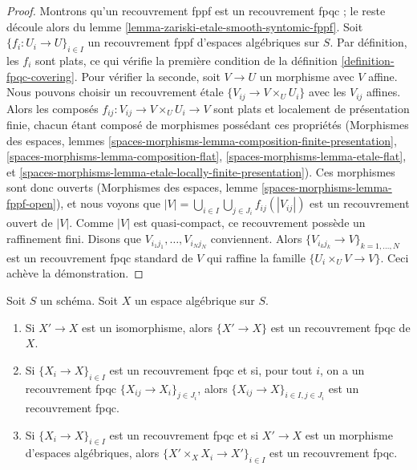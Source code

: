 \begin{proof}
Montrons qu'un recouvrement fppf est un recouvrement fpqc ; le
reste découle alors du
lemme \ref{lemma-zariski-etale-smooth-syntomic-fppf}.
Soit $\{f_i : U_i \to U\}_{i \in I}$ un
recouvrement fppf d'espaces algébriques sur $S$.
Par définition, les $f_i$ sont plats, ce qui vérifie la première
condition de la définition \ref{definition-fpqc-covering}. Pour vérifier la
seconde, soit $V \to U$ un morphisme avec $V$ affine.
Nous pouvons choisir un recouvrement \'etale $\{V_{ij} \to V \times_U U_i\}$
avec les $V_{ij}$ affines. Alors les composés
$f_{ij} : V_{ij} \to V \times_U U_i \to V$ sont plats et localement de
présentation finie, chacun étant composé de morphismes possédant ces propriétés
(Morphismes des espaces, lemmes
\ref{spaces-morphisms-lemma-composition-finite-presentation},
\ref{spaces-morphisms-lemma-composition-flat},
\ref{spaces-morphisms-lemma-etale-flat}, et
\ref{spaces-morphisms-lemma-etale-locally-finite-presentation}).
Ces morphismes sont donc ouverts
(Morphismes des espaces, lemme \ref{spaces-morphisms-lemma-fppf-open}),
et nous voyons que
$|V| = \bigcup_{i \in I} \bigcup_{j \in J_i} f_{ij}(|V_{ij}|)$
est un recouvrement ouvert de $|V|$.
Comme $|V|$ est quasi-compact, ce recouvrement possède un
raffinement fini.
Disons que $V_{i_1j_1}, \ldots, V_{i_Nj_N}$ conviennent.
Alors $\{V_{i_kj_k} \to V\}_{k = 1, \ldots, N}$ est
un recouvrement fpqc standard de $V$ qui raffine la famille
$\{U_i \times_U V \to V\}$.
Ceci achève la démonstration.
\end{proof}

\begin{lemma}
\label{lemma-fpqc}
Soit $S$ un schéma.
Soit $X$ un espace algébrique sur $S$.
\begin{enumerate}
\item Si $X' \to X$ est un isomorphisme, alors $\{X' \to X\}$
est un recouvrement fpqc de $X$.
\item Si $\{X_i \to X\}_{i\in I}$ est un recouvrement fpqc et si, pour tout
$i$, on a un recouvrement fpqc $\{X_{ij} \to X_i\}_{j\in J_i}$, alors
$\{X_{ij} \to X\}_{i \in I, j\in J_i}$ est un recouvrement fpqc.
\item Si $\{X_i \to X\}_{i\in I}$ est un recouvrement fpqc
et si $X' \to X$ est un morphisme d'espaces algébriques, alors
$\{X' \times_X X_i \to X'\}_{i\in I}$ est un recouvrement fpqc.
\end{enumerate}
\end{lemma}

